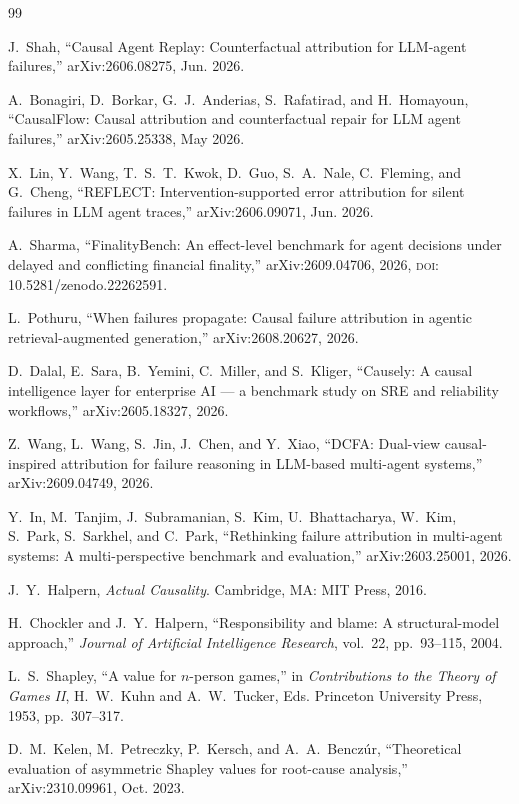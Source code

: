 \documentclass[conference]{IEEEtran}
\begin{document}
\begin{thebibliography}{99}

J.~Shah, ``Causal Agent Replay: Counterfactual attribution for LLM-agent
failures,'' arXiv:2606.08275, Jun. 2026.

A.~Bonagiri, D.~Borkar, G.~J.~Anderias, S.~Rafatirad, and H.~Homayoun,
``CausalFlow: Causal attribution and counterfactual repair for LLM agent
failures,'' arXiv:2605.25338, May 2026.

X.~Lin, Y.~Wang, T.~S.~T.~Kwok, D.~Guo, S.~A.~Nale, C.~Fleming, and G.~Cheng,
``REFLECT: Intervention-supported error attribution for silent failures in LLM
agent traces,'' arXiv:2606.09071, Jun. 2026.

A.~Sharma, ``FinalityBench: An effect-level benchmark for agent decisions under
delayed and conflicting financial finality,'' arXiv:2609.04706, 2026,
\textsc{doi}: 10.5281/zenodo.22262591.

L.~Pothuru, ``When failures propagate: Causal failure attribution in agentic
retrieval-augmented generation,'' arXiv:2608.20627, 2026.

D.~Dalal, E.~Sara, B.~Yemini, C.~Miller, and S.~Kliger, ``Causely: A causal
intelligence layer for enterprise AI --- a benchmark study on SRE and
reliability workflows,'' arXiv:2605.18327, 2026.

Z.~Wang, L.~Wang, S.~Jin, J.~Chen, and Y.~Xiao, ``DCFA: Dual-view
causal-inspired attribution for failure reasoning in LLM-based multi-agent
systems,'' arXiv:2609.04749, 2026.

Y.~In, M.~Tanjim, J.~Subramanian, S.~Kim, U.~Bhattacharya, W.~Kim, S.~Park,
S.~Sarkhel, and C.~Park, ``Rethinking failure attribution in multi-agent
systems: A multi-perspective benchmark and evaluation,'' arXiv:2603.25001,
2026.

J.~Y.~Halpern, \emph{Actual Causality}. Cambridge, MA: MIT Press, 2016.

H.~Chockler and J.~Y.~Halpern, ``Responsibility and blame: A structural-model
approach,'' \emph{Journal of Artificial Intelligence Research}, vol.~22,
pp.~93--115, 2004.

L.~S.~Shapley, ``A value for $n$-person games,'' in \emph{Contributions to the
Theory of Games II}, H.~W.~Kuhn and A.~W.~Tucker, Eds. Princeton University
Press, 1953, pp.~307--317.

D.~M.~Kelen, M.~Petreczky, P.~Kersch, and A.~A.~Bencz\'ur, ``Theoretical
evaluation of asymmetric Shapley values for root-cause analysis,''
arXiv:2310.09961, Oct. 2023.

\end{thebibliography}
\end{document}
